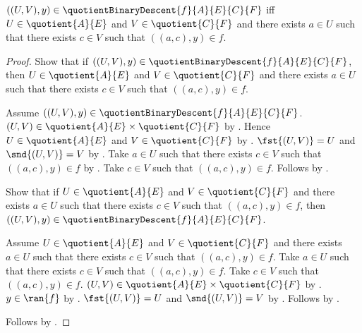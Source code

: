\begin{proposition}\label{quotient_binary_descent_iff}
    $((U,V),y)\in\quotientBinaryDescent{f}{A}{E}{C}{F}$ iff
        $U\in\quotient{A}{E}$ and $V\in\quotient{C}{F}$ and
        there exists $a\in U$ such that there exists $c\in V$ such that
            $((a,c),y)\in f$.
\end{proposition}
\begin{proof}
    Show that if
        $((U,V),y)\in\quotientBinaryDescent{f}{A}{E}{C}{F}$, then
        $U\in\quotient{A}{E}$ and $V\in\quotient{C}{F}$ and
        there exists $a\in U$ such that there exists $c\in V$ such that
            $((a,c),y)\in f$.
    \begin{subproof}
        Assume $((U,V),y)\in
            \quotientBinaryDescent{f}{A}{E}{C}{F}$.
        $(U,V)\in\quotient{A}{E}\times\quotient{C}{F}$ by
            .
        Hence $U\in\quotient{A}{E}$ and $V\in\quotient{C}{F}$ by
            .
        $\fst{(U,V)}=U$ and $\snd{(U,V)}=V$ by
            .
        Take $a\in U$ such that there exists $c\in V$ such that
            $((a,c),y)\in f$ by
            .
        Take $c\in V$ such that $((a,c),y)\in f$.
        Follows by \auto.
    \end{subproof}
    Show that if $U\in\quotient{A}{E}$ and $V\in\quotient{C}{F}$ and
        there exists $a\in U$ such that there exists $c\in V$ such that
            $((a,c),y)\in f$,
        then $((U,V),y)\in
            \quotientBinaryDescent{f}{A}{E}{C}{F}$.
    \begin{subproof}
        Assume $U\in\quotient{A}{E}$ and $V\in\quotient{C}{F}$ and
            there exists $a\in U$ such that there exists $c\in V$ such that
                $((a,c),y)\in f$.
        Take $a\in U$ such that there exists $c\in V$ such that
            $((a,c),y)\in f$.
        Take $c\in V$ such that $((a,c),y)\in f$.
        $(U,V)\in\quotient{A}{E}\times\quotient{C}{F}$ by
            .
        $y\in\ran{f}$ by .
        $\fst{(U,V)}=U$ and $\snd{(U,V)}=V$ by
            .
        Follows by .
    \end{subproof}
    Follows by \auto.
\end{proof}

